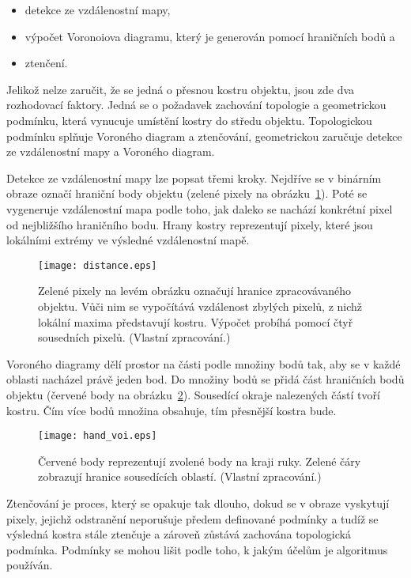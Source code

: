 \begin{itemize}
\item detekce ze vzdálenostní mapy,
\item výpočet Voronoiova diagramu, který je generován pomocí hraničních bodů a
\item ztenčení.
\end{itemize}

Jelikož nelze zaručit, že se jedná o přesnou kostru objektu, jsou zde dva rozhodovací faktory. Jedná se o požadavek zachování topologie a geometrickou podmínku, která vynucuje umístění kostry do středu objektu. Topologickou podmínku splňuje Voroného diagram a ztenčování, geometrickou zaručuje detekce ze vzdálenostní mapy a Voroného diagram.

Detekce ze vzdálenostní mapy lze popsat třemi kroky. Nejdříve se v binárním obraze označí hraniční body objektu (zelené pixely na obrázku~\ref{distance}). Poté se vygeneruje vzdálenostní mapa podle toho, jak daleko se nachází konkrétní pixel od nejbližšího hraničního bodu. Hrany kostry reprezentují pixely, které jsou lokálními extrémy ve výsledné vzdálenostní mapě.
\begin{figure}[h]
\centering
\texttt{[image: distance.eps]}
\caption{Zelené pixely na levém obrázku označují hranice zpracovávaného objektu. Vůči nim se vypočítává vzdálenost zbylých pixelů, z nichž lokální maxima představují kostru. Výpočet probíhá pomocí čtyř sousedních pixelů. (Vlastní zpracování.)}
\label{distance}
\end{figure}

Voroného diagramy dělí prostor na části podle množiny bodů tak, aby se v každé oblasti nacházel právě jeden bod. Do množiny bodů se přidá část hraničních bodů objektu (červené body na obrázku~\ref{picVoi}). Sousedící okraje nalezených částí tvoří kostru. Čím více bodů množina obsahuje, tím přesnější kostra bude.
\begin{figure}[h]
\centering
\texttt{[image: hand\_voi.eps]}
\caption{Červené body reprezentují zvolené body na kraji ruky. Zelené čáry zobrazují hranice sousedících oblastí. (Vlastní zpracování.)}
\label{picVoi}
\end{figure}

Ztenčování je proces, který se opakuje tak dlouho, dokud se v obraze vyskytují pixely, jejichž odstranění neporušuje předem definované podmínky a tudíž se výsledná kostra stále ztenčuje a zároveň zůstává zachována topologická podmínka. Podmínky se mohou lišit podle toho, k jakým účelům je algoritmus používán.


